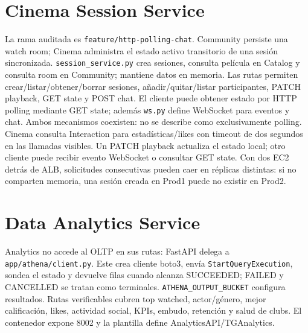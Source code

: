 \section{Cinema Session Service}
La rama auditada es \texttt{feature/http-polling-chat}. Community persiste una watch room; Cinema administra el estado activo transitorio de una sesión sincronizada. \texttt{session\_service.py} crea sesiones, consulta película en Catalog y consulta room en Community; mantiene datos en memoria. Las rutas permiten crear/listar/obtener/borrar sesiones, añadir/quitar/listar participantes, PATCH playback, GET state y POST chat. El cliente puede obtener estado por HTTP polling mediante GET state; además \texttt{ws.py} define WebSocket para eventos y chat. Ambos mecanismos coexisten: no se describe como exclusivamente polling. Cinema consulta Interaction para estadísticas/likes con timeout de dos segundos en las llamadas visibles. Un PATCH playback actualiza el estado local; otro cliente puede recibir evento WebSocket o consultar GET state. Con dos EC2 detrás de ALB, solicitudes consecutivas pueden caer en réplicas distintas: si no comparten memoria, una sesión creada en Prod1 puede no existir en Prod2.\section{Data Analytics Service}
Analytics no accede al OLTP en sus rutas: FastAPI delega a \texttt{app/athena/client.py}. Este crea cliente boto3, envía \texttt{StartQueryExecution}, sondea el estado y devuelve filas cuando alcanza SUCCEEDED; FAILED y CANCELLED se tratan como terminales. \texttt{ATHENA\_OUTPUT\_BUCKET} configura resultados. Rutas verificables cubren top watched, actor/género, mejor calificación, likes, actividad social, KPIs, embudo, retención y salud de clubs. El contenedor expone 8002 y la plantilla define AnalyticsAPI/TGAnalytics.
